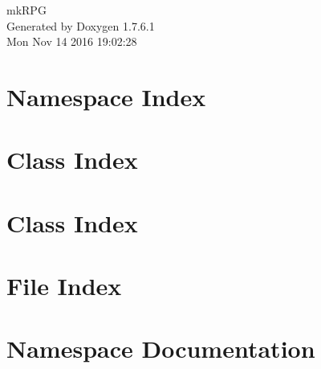 \documentclass[a4paper]{book}
\begin{document}
\hypersetup{pageanchor=false,citecolor=blue}
\begin{titlepage}
\vspace*{7cm}
\begin{center}
{\Large mk\-R\-P\-G }\\
\vspace*{1cm}
{\large \-Generated by Doxygen 1.7.6.1}\\
\vspace*{0.5cm}
{\small Mon Nov 14 2016 19:02:28}\\
\end{center}
\end{titlepage}
\clearemptydoublepage
{}
\tableofcontents
\clearemptydoublepage
{}
\hypersetup{pageanchor=true,citecolor=blue}
\chapter{\-Namespace \-Index}

\chapter{\-Class \-Index}

\chapter{\-Class \-Index}

\chapter{\-File \-Index}

\chapter{\-Namespace \-Documentation}

\end{document}
